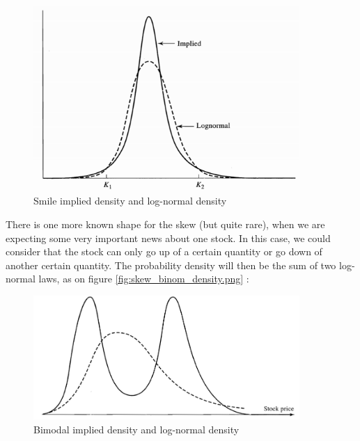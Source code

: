 \documentclass[hidelinks]{article}
\theoremstyle{definition}
\begin{document}
     \begin{figure}[!h]
	\centering
	\includegraphics[width=0.9\textwidth]{smile_density.png}
    \caption{Smile implied density and log-normal density}
    \label{fig:smile_density}
    \end{figure}
    
    
    There is one more known shape for the skew (but quite rare), when we are expecting some very important news about one stock. In this case, we could consider that the stock can only go up of a certain quantity or go down of another certain quantity. The probability density will then be the sum of two log-normal laws, as on figure \ref{fig:skew_binom_density.png} :
      \begin{figure}[!h]
	\centering
	\includegraphics[width=0.9\textwidth]{skew_binom_density.png}
    \caption{Bimodal implied density and log-normal density}
    \label{fig:skew_binom_density}
    \end{figure}
    
\end{document}
